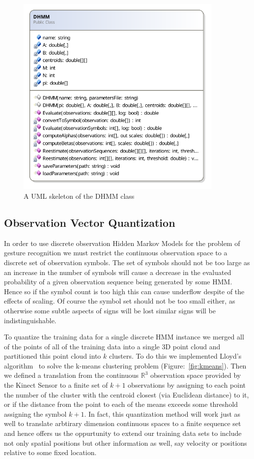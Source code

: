 \begin{figure}[h!]
        \centering
        \includegraphics[width=0.9\textwidth]{ThesisFigs/DHMMDiag}
        \caption{A UML skeleton of the DHMM class}\label{fig:dhmmdiag}
\end{figure}

\subsection{Observation Vector Quantization}
In order to use discrete observation Hidden Markov Models for the problem of gesture recognition we must restrict the continuous observation space to a discrete set of observation symbols. The set of symbols should not be too large as an increase in the number of symbols will cause a decrease in the evaluated probability of a given observation sequence being generated by some HMM. Hence so if the symbol count is too high this can cause underflow despite of the effects of scaling. Of course the symbol set should not be too small either, as otherwise some subtle aspects of signs will be lost similar signs will be indistinguishable.

To quantize the training data for a single discrete HMM instance we merged all of the points of all of the training data into a single 3D point cloud and partitioned this point cloud into $k$ clusters. To do this we implemented Lloyd's algorithm~\citep{lloyd1982least} to solve the k-means clustering problem (Figure:~\ref{fig:kmeans}). Then we defined a translation from the continuous $\mathbb{R}^3$ observation space provided by the Kinect Sensor to a finite set of $k+1$ observations by assigning to each point the number of the cluster with the centroid closest (via Euclidean distance) to it, or if the distance from the point to each of the means exceeds some threshold assigning the symbol $k+1$. In fact, this quantization method will work just as well to translate arbtirary dimension continuous spaces to a finite sequence set and hence offers us the oppurtunity to extend our training data sets to include not only spatial positions but other information as well, say velocity or positions relative to some fixed location.

